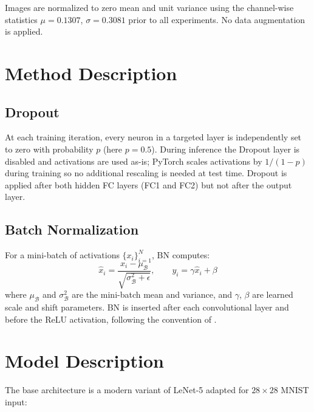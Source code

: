 \documentclass[11pt]{article}
\begin{document}
Images are normalized to zero mean and unit variance using the channel-wise statistics
$\mu = 0.1307$, $\sigma = 0.3081$ prior to all experiments. No data augmentation is applied.

\section{Method Description}

\subsection{Dropout}
At each training iteration, every neuron in a targeted layer is independently set to zero
with probability $p$ (here $p=0.5$). During inference the Dropout layer is disabled and
activations are used as-is; PyTorch scales activations by $1/(1-p)$ during training
so no additional rescaling is needed at test time. Dropout is applied after both
hidden FC layers (FC1 and FC2) but not after the output layer.

\subsection{Batch Normalization}
For a mini-batch of activations $\{x_i\}_{i=1}^{N}$, BN computes:
\[
  \hat{x}_i = \frac{x_i - \mu_\mathcal{B}}{\sqrt{\sigma^2_\mathcal{B} + \epsilon}},
  \qquad
  y_i = \gamma \hat{x}_i + \beta
\]
where $\mu_\mathcal{B}$ and $\sigma^2_\mathcal{B}$ are the mini-batch mean and variance,
and $\gamma$, $\beta$ are learned scale and shift parameters. BN is inserted after each
convolutional layer and before the ReLU activation, following the convention of
\cite{ioffe2015batch}.

\section{Model Description}

The base architecture is a modern variant of LeNet-5 adapted for $28\times28$ MNIST input:
\end{document}
